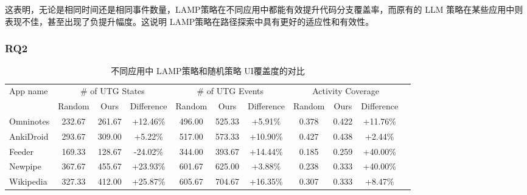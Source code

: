 \documentclass[twocolumn, 10pt]{article}
\newcommand{\lamp}{L{\small\MakeUppercase{amp}}}
\begin{document}
这表明，无论是相同时间还是相同事件数量，\lamp 策略在不同应用中都能有效提升代码分支覆盖率，而原有的 LLM 策略在某些应用中则表现不佳，甚至出现了负提升幅度。这说明 \lamp 策略在路径探索中具有更好的适应性和有效性。

\subsubsection{RQ2}

\begin{table}[t]\small
\centering
\begin{tabular}{lcccccccccc}
\toprule
\multirow{2}{*}{App name} 
& \multicolumn{3}{c}{\# of UTG States} 
& \multicolumn{3}{c}{\# of UTG Events} 
& \multicolumn{3}{c}{Activity Coverage} \\
\cmidrule(lr){2-4} \cmidrule(lr){5-7} \cmidrule(lr){8-10}
& Random & Ours & Difference 
& Random & Ours & Difference 
& Random & Ours & Difference \\
\midrule
Omninotes & 232.67 & \cellcolor{gray!15}261.67 & \cellcolor{gray!25}+12.46\% 
          & 496.00 & \cellcolor{gray!15}525.33 & \cellcolor{gray!25}+5.91\%
          & 0.378 & \cellcolor{gray!15}0.422 & \cellcolor{gray!25}+11.76\% \\
AnkiDroid & 293.67 & \cellcolor{gray!15}309.00 & \cellcolor{gray!25}+5.22\% 
          & 517.00 & \cellcolor{gray!15}573.33 & \cellcolor{gray!25}+10.90\% 
          & 0.427 & \cellcolor{gray!15}0.438 & \cellcolor{gray!25}+2.44\% \\
Feeder    & 169.33 & \cellcolor{gray!15}128.67 & \cellcolor{gray!25}-24.02\% 
          & 344.00 & \cellcolor{gray!15}393.67 & \cellcolor{gray!25}+14.44\% 
          & 0.185 & \cellcolor{gray!15}0.259 & \cellcolor{gray!25}+40.00\% \\
Newpipe   & 367.67 & \cellcolor{gray!15}455.67 & \cellcolor{gray!25}+23.93\% 
          & 601.67 & \cellcolor{gray!15}625.00 & \cellcolor{gray!25}+3.88\% 
          & 0.238 & \cellcolor{gray!15}0.333 & \cellcolor{gray!25}+40.00\% \\
Wikipedia & 327.33 & \cellcolor{gray!15}412.00 & \cellcolor{gray!25}+25.87\% 
          & 605.67 & \cellcolor{gray!15}704.67 & \cellcolor{gray!25}+16.35\% 
          & 0.307 & \cellcolor{gray!15}0.333 & \cellcolor{gray!25}+8.47\% \\
\bottomrule
\end{tabular}
\caption{不同应用中 \lamp 策略和随机策略 UI覆盖度的对比}
\label{tab:app-coverage}
\end{table}
\end{document}

